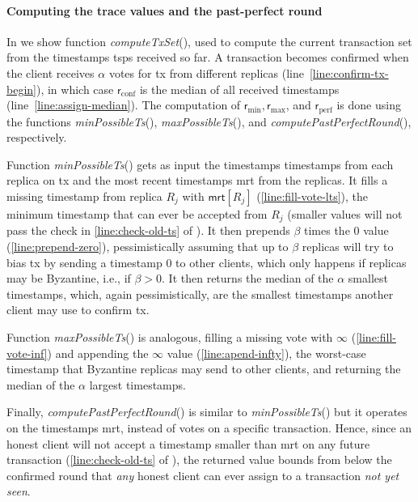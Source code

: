 \documentclass[pdflatex,sn-mathphys-num]{sn-jnl}%
\theoremstyle{thmstyleone}%
\theoremstyle{thmstyletwo}%
\theoremstyle{thmstylethree}%
\newcommand{\op}[1]{\textsl{#1}}
\newcommand{\opMinPossibleTs}[1]{\op{minPossibleTs}(#1)\xspace}
\newcommand{\opMaxPossibleTs}[1]{\op{maxPossibleTs}(#1)\xspace}
\newcommand{\opMinPossibleTsForNewTx}[1]{\op{computePastPerfectRound}(#1)\xspace}
\newcommand{\operand}[1]{\textsf{#1}}
\newcommand{\tx}{\operand{tx}\xspace}
\newcommand{\round}{\operand{r}\xspace}
\newcommand{\rconf}{\ensuremath{\round_\text{conf}}\xspace}
\newcommand{\rmin}{\ensuremath{\round_\text{min}}\xspace}
\newcommand{\rmax}{\ensuremath{\round_\text{max}}\xspace}
\newcommand{\rperf}{\ensuremath{\round_\text{perf}}\xspace}
\newcommand{\rep}{\ensuremath{R}\xspace}
\newcommand{\mrt}{\operand{mrt}\xspace}
\newcommand{\tsps}{\operand{tsps}\xspace}
\newcommand{\txVotesMin}{\operand{timestamps}\xspace}
\newcommand{\dotparagraph}[1]{\paragraph*{#1}}
\newcommand{\confirmed}{confirmed\xspace}
\let\oldalpha\alpha
\renewcommand{\alpha}{\ensuremath{\oldalpha}\xspace}
\let\oldbeta\beta
\renewcommand{\beta}{\ensuremath{\oldbeta}\xspace}
\newcommand{\opComputeTxSet}[1]{\op{computeTxSet}(#1)\xspace}
\begin{document}
\dotparagraph{Computing the trace values and the past-perfect round}
In  we show function \opComputeTxSet{}, used to compute the current transaction set from the timestamps \tsps received so far.
A transaction becomes \confirmed when the client receives \alpha votes for \tx from different replicas (line~\ref{line:confirm-tx-begin}), in which case \rconf is the median of all received timestamps (line~\ref{line:assign-median}).
The computation of $\rmin, \rmax$, and \rperf is done using the functions \opMinPossibleTs{}, \opMaxPossibleTs{}, and \opMinPossibleTsForNewTx{}, respectively.

Function \opMinPossibleTs{} gets as input the timestamps \txVotesMin from each replica on \tx and the most recent timestamps \mrt from the replicas. It fills a missing timestamp from replica $\rep_j$ with $\mrt[\rep_j]$ (\cref{line:fill-vote-lts}),
the minimum timestamp that can ever be  accepted from $\rep_j$ (smaller values will not pass the check in \cref{line:check-old-ts} of ).
It then prepends \beta times the $0$ value (\cref{line:prepend-zero}), pessimistically assuming that up to $\beta$ replicas will try to bias \tx by sending a timestamp $0$ to other clients, which only happens if replicas may be Byzantine, i.e., if $\beta > 0$.
It then returns the median of the \alpha smallest timestamps, which, again pessimistically, are the smallest timestamps another client may use to confirm \tx.

Function \opMaxPossibleTs{} is analogous, filling a missing vote with $\infty$ (\cref{line:fill-vote-inf})
and appending the $\infty$ value (\cref{line:apend-infty}), the worst-case timestamp that Byzantine replicas may send to other clients,
and returning the median of the \alpha largest timestamps.

Finally, \opMinPossibleTsForNewTx{} is similar to \opMinPossibleTs{} but it operates on the timestamps \mrt, instead of votes on a specific transaction. Hence, since an honest client will not accept a timestamp smaller than \mrt on any future transaction (\cref{line:check-old-ts} of ), the returned value bounds from below the \confirmed round that \emph{any} honest client can ever assign to a transaction \emph{not yet seen}.
\end{document}
